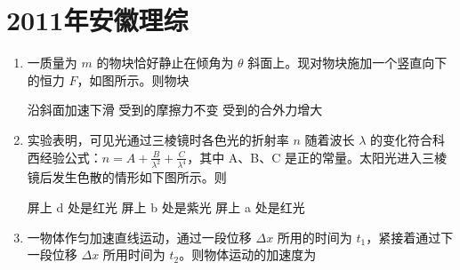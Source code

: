 \documentclass[\gkver]{gaokaozhenti}
\begin{document}
\chapter{2011年安徽理综}

\begin{enumerate}
\item
一质量为 $m$ 的物块恰好静止在倾角为 $\theta$ 斜面上。现对物块施加一个竖直向下的恒力 $F$，如图所示。则物块


{沿斜面加速下滑}
{受到的摩擦力不变}
{受到的合外力增大}


\item
实验表明，可见光通过三棱镜时各色光的折射率 $n$ 随着波长 $\lambda$ 的变化符合科西经验公式：$n=A+\frac{B}{\lambda^{2}}+\frac{C}{\lambda^{4}}$，其中 A、B、C 是正的常量。太阳光进入三棱镜后发生色散的情形如下图所示。则


{屏上 d 处是红光}
{屏上 b 处是紫光}
{屏上 a 处是红光}


\item
一物体作匀加速直线运动，通过一段位移 $\Delta x$ 所用的时间为 $t_{1}$，紧接着通过下一段位移 $\Delta x$ 所用时间为 $t_{2}$。则物体运动的加速度为


\end{enumerate}
\end{document}
